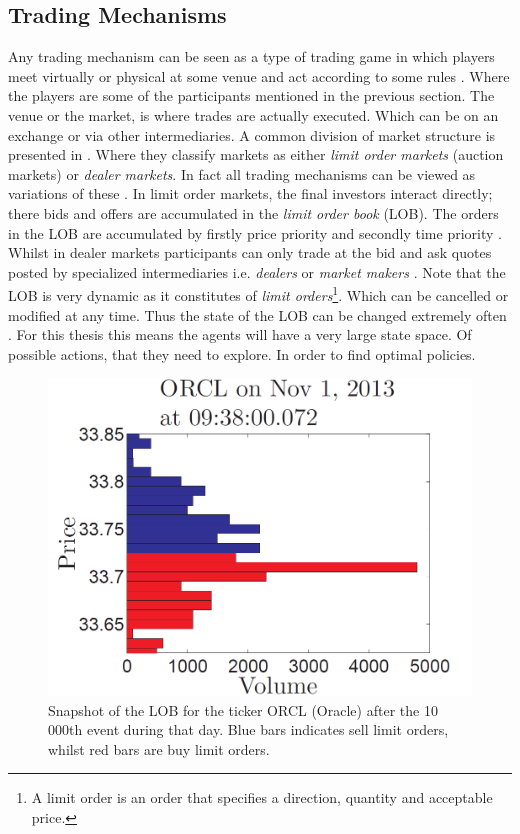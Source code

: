 \documentclass{kththesis}
\theoremstyle{definition}
\begin{document}
\subsection{Trading Mechanisms}
Any trading mechanism can be seen as a type of trading game in which players meet virtually or physical at some venue and act according to some rules \parencite{o1995market}. Where the players are some of the participants mentioned in the previous section. The venue or the market,  is where trades are actually executed. Which can be on an exchange or via other intermediaries. A common division of market structure is presented in \textcite{foucault2013market}. Where they classify markets as either \textit{limit order markets} (auction markets) or \textit{dealer markets}. In fact all trading mechanisms can be viewed as variations of these \parencite{foucault2013market}.
\newline
\newline
In limit order markets, the final investors interact directly; there bids and offers are accumulated in the \textit{limit order book} (LOB). The orders in the LOB are accumulated by firstly price priority and secondly time priority \parencite{hasbrouck2007empirical}. Whilst in dealer markets participants can only trade at the bid and ask quotes posted by specialized intermediaries i.e. \textit{dealers} or \textit{market makers} \parencite{foucault2013market}. Note that the LOB is very dynamic as it constitutes of \textit{limit orders}\footnote{A limit order is an order that specifies a direction, quantity and acceptable price.}. Which can be cancelled or modified at any time. Thus the state of the LOB can be changed extremely often \parencite{hasbrouck2007empirical}. For this thesis this means the agents will have a very large state space. Of possible actions, that they need to explore. In order to find optimal policies.

\begin{figure}[H]
    \centering
    \includegraphics[scale=.65]{LOBex.PNG}
    \caption{Snapshot of the LOB for the ticker ORCL (Oracle) after the 10 000th event during that day. Blue bars indicates sell limit orders, whilst red bars are buy limit orders.}
    \label{fig:2}
\end{figure}
\end{document}
